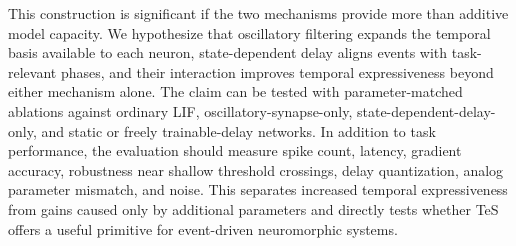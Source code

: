 This construction is significant if the two mechanisms provide more than additive model capacity. We hypothesize that oscillatory filtering expands the temporal basis available to each neuron, state-dependent delay aligns events with task-relevant phases, and their interaction improves temporal expressiveness beyond either mechanism alone. The claim can be tested with parameter-matched ablations against ordinary LIF, oscillatory-synapse-only, state-dependent-delay-only, and static or freely trainable-delay networks. In addition to task performance, the evaluation should measure spike count, latency, gradient accuracy, robustness near shallow threshold crossings, delay quantization, analog parameter mismatch, and noise. This separates increased temporal expressiveness from gains caused only by additional parameters and directly tests whether TeS offers a useful primitive for event-driven neuromorphic systems.
